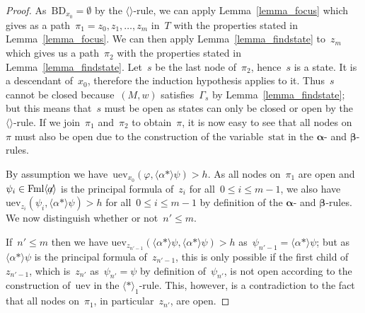\documentclass{entcs}
\newcommand{\pea}[2]{\langle#1\rangle #2}
\newcommand{\prp}[1]{#1*}
\newcommand{\fmlean}{\mathrm{Fml}\pea{\not\!\!a}{}}
\newcommand{\tbdia}{\mathrm{BD}}
\newcommand{\tmrk}{\mathrm{stat}}
\newcommand{\tuev}{\mathrm{uev}}
\newcommand{\talpha}{\boldsymbol{\alpha}}
\newcommand{\tbeta}{\boldsymbol{\beta}}
\newcommand{\trero}{$\pea{\prp{}}{}_1$}
\newcommand{\trea}{$\langle\rangle$}
\begin{document}
\begin{proof}
  As~$\tbdia_{x_0} = \emptyset$ by the \trea{}-rule,
  we can apply Lemma~\ref{lemma_focus}
  which gives as a path~$\pi_1 = z_0, z_1, \dotsc, z_m$ in~$T$
  with the properties stated in Lemma~\ref{lemma_focus}.
  We can then apply Lemma~\ref{lemma_findstate} to~$z_m$
  which gives us a path~$\pi_2$ with the properties stated in Lemma~\ref{lemma_findstate}.
  Let~$s$ be the last node of~$\pi_2$, hence~$s$ is a state.
  It is a descendant of~$x_0$,
  therefore the induction hypothesis applies to it.
  Thus~$s$ cannot be closed because~$(M, w)$ satisfies~$\Gamma_s$ by Lemma~\ref{lemma_findstate};
  but this means that~$s$ must be open 
  as states can only be closed or open by the \trea{}-rule.
  If we join~$\pi_1$ and~$\pi_2$ to obtain~$\pi$,
  it is now easy to see that all nodes on~$\pi$ must also be open 
  due to the construction of the variable~$\tmrk$ in the $\talpha$- and $\tbeta$-rules.

  By assumption we have~$\tuev_{x_0}(\varphi, \pea{\prp{\alpha}}{\psi}) > h$.
  As all nodes on~$\pi_1$ are open
  and~$\psi_i \in \fmlean$ is the principal formula of~$z_i$ for all~$0 \leq i \leq m-1$,
  we also have~$\tuev_{z_i}(\psi_i, \pea{\prp{\alpha}}{\psi}) > h$ for all~$0 \leq i \leq m-1$
  by definition of the $\talpha$- and $\tbeta$-rules.
  We now distinguish whether or not~$n' \leq m$.

  If~$n' \leq m$ then we have $\tuev_{z_{n'-1}}(\pea{\prp{\alpha}}{\psi}, \pea{\prp{\alpha}}{\psi}) > h$
  as~$\psi_{n'-1} = \pea{\prp{\alpha}}{\psi}$;
  but as~$\pea{\prp{\alpha}}{\psi}$ is the principal formula of~$z_{n'-1}$,
  this is only possible if the first child of~$z_{n'-1}$,
  which is~$z_{n'}$ as~$\psi_{n'} = \psi$ by definition of~$\psi_{n'}$, is not open
  according to the construction of~$\tuev$ in the \trero{}-rule.
  This, however, is a contradiction to the fact that all nodes on~$\pi_1$,
  in particular~$z_{n'}$, are open.


\end{proof}
\end{document}
